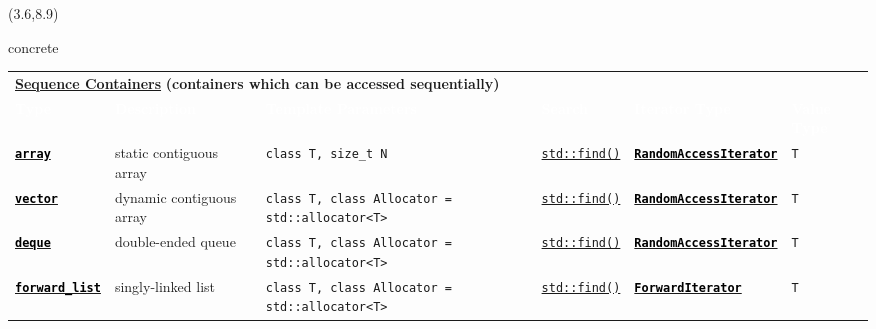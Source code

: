 \documentclass{beamer}
\newcommand\ccode[1]{\textcolor{black}{\texttt{\textbf{#1}}}}
\newcommand\hcode[1]{\textcolor{black}{\texttt{\textbf{#1}}}}
\newcommand\codel[1]{\texttt{#1}}
\newcommand\htblt[1]{\textcolor{purpleth}{\textbf{\Large{#1}}}}
\begin{document}
\begin{textblock}{65.2}(3.6,8.9)
  \renewcommand{\arraystretch}{1.06}%
  \begin{beamercolorbox}[sep=2mm,wd=65.2cm,rounded=true]{concrete}
    \setlength\tabcolsep{.4em}
    \begin{tabular*}{\linewidth}{l  l  l  l  l  l}
      \multicolumn{6}{l}{\htblt{\href{http://en.cppreference.com/w/cpp/container}{Sequence Containers}}\hspace*{1em} \textcolor{purpleth}{\large{\textbf{(containers which can be accessed sequentially)}}}} \\
      \cellcolor{purpleth}\textcolor{white}{\bfseries{Type}} & \cellcolor{purpleth}\textcolor{white}{\bfseries{Description}} & \cellcolor{purpleth}\textcolor{white}{\bfseries{Template Parameters}} & \cellcolor{purpleth}\textcolor{white}{\bfseries{Search}} & \cellcolor{purpleth}\textcolor{white}{\bfseries{Iterator Type}} & \cellcolor{purpleth}\textcolor{white}{\bfseries{Value Type}} \\
      \href{http://en.cppreference.com/w/cpp/container/array}{\hcode{array}} & static contiguous array & \codel{class T, size\_t N} & \href{http://en.cppreference.com/w/cpp/algorithm/find}{\codel{std::find()}} & \href{http://en.cppreference.com/w/cpp/concept/RandomAccessIterator}{\ccode{RandomAccessIterator}} & \codel{T} \hfill \\
      \rowcolor{white}
      \href{http://en.cppreference.com/w/cpp/container/vector}{\hcode{vector}} & dynamic contiguous array & \codel{class T, class Allocator = std::allocator<T>} & \href{http://en.cppreference.com/w/cpp/algorithm/find}{\codel{std::find()}} & \href{http://en.cppreference.com/w/cpp/concept/RandomAccessIterator}{\ccode{RandomAccessIterator}} & \codel{T} \\
      \href{http://en.cppreference.com/w/cpp/container/deque}{\hcode{deque}} & double-ended queue & \codel{class T, class Allocator = std::allocator<T>} & \href{http://en.cppreference.com/w/cpp/algorithm/find}{\codel{std::find()}} & \href{http://en.cppreference.com/w/cpp/concept/RandomAccessIterator}{\ccode{RandomAccessIterator}} & \codel{T} \\
      \rowcolor{white}
      \href{http://en.cppreference.com/w/cpp/container/forward_list}{\hcode{forward\_list}} & singly-linked list & \codel{class T, class Allocator = std::allocator<T>} & \href{http://en.cppreference.com/w/cpp/algorithm/find}{\codel{std::find()}} & \href{http://en.cppreference.com/w/cpp/concept/ForwardIterator}{\ccode{ForwardIterator}} & \codel{T} \\

\end{tabular*}
\end{beamercolorbox}
\end{textblock}
\end{document}
